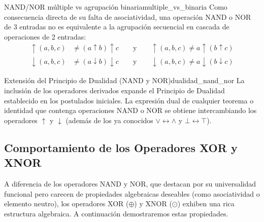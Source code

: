 \begin{teorema}{NAND/NOR múltiple vs agrupación binaria}{multiple_vs_binaria}
Como consecuencia directa de su falta de asociatividad, una operación NAND o NOR de 3 entradas no es equivalente a la agrupación secuencial en cascada de operaciones de 2 entradas:
\begin{align*}
    \uparrow(a,b,c) &\neq (a \uparrow b) \uparrow c \qquad \text{y} \qquad \uparrow(a,b,c) \neq a \uparrow (b \uparrow c) \\
    \downarrow(a,b,c) &\neq (a \downarrow b) \downarrow c \qquad \text{y} \qquad \downarrow(a,b,c) \neq a \downarrow (b \downarrow c)
\end{align*}
\end{teorema}

\begin{teorema}{Extensión del Principio de Dualidad (NAND y NOR)}{dualidad_nand_nor}
La inclusión de los operadores derivados expande el Principio de Dualidad establecido en los postulados iniciales. La expresión dual de cualquier teorema o identidad que contenga operaciones NAND o NOR se obtiene intercambiando los operadores $\uparrow$ y $\downarrow$ (además de los ya conocidos $\vee \leftrightarrow \wedge$ y $\bot \leftrightarrow \top$).
\end{teorema}
\subsection{Comportamiento de los Operadores XOR y XNOR}
A diferencia de los operadores NAND y NOR, que destacan por su universalidad funcional pero carecen de propiedades algebraicas deseables (como asociatividad o elemento neutro), los operadores XOR ($\oplus$) y XNOR ($\odot$) exhiben una rica estructura algebraica. A continuación demostraremos estas propiedades.

